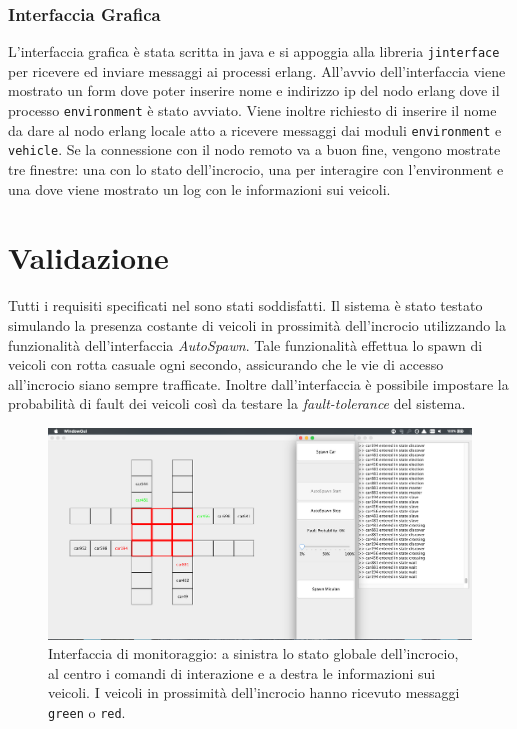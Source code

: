 \documentclass{memoir}
\begin{document}
\subsection{Interfaccia Grafica}
L'interfaccia grafica è stata scritta in java e si appoggia alla libreria
\texttt{jinterface} per ricevere ed inviare messaggi ai processi erlang.
All'avvio dell'interfaccia viene mostrato un form dove poter inserire nome e
indirizzo ip del nodo erlang dove il processo \texttt{environment} è stato
avviato. Viene inoltre richiesto di inserire il nome da dare al nodo erlang
locale atto a ricevere messaggi dai moduli \texttt{environment} e
\texttt{vehicle}. Se la connessione con il nodo remoto va a buon fine, vengono
mostrate tre finestre: una con lo stato dell'incrocio, una per interagire con
l'environment e una dove viene mostrato un log con le informazioni sui veicoli.

\chapter{Validazione}
Tutti i requisiti specificati nel  sono stati soddisfatti. Il
sistema è stato testato simulando la presenza costante di veicoli in prossimità
dell'incrocio utilizzando la funzionalità dell'interfaccia \emph{AutoSpawn}.
Tale funzionalità effettua lo spawn di veicoli con rotta casuale ogni secondo,
assicurando che le vie di accesso all'incrocio siano sempre trafficate. Inoltre
dall'interfaccia è possibile impostare la probabilità di fault dei veicoli così
da testare la \emph{fault-tolerance} del sistema.

\begin{figure}
\centering
\includegraphics[width=\textwidth]{greenred}
\caption{Interfaccia di monitoraggio: a sinistra lo stato globale dell'incrocio,
  al centro i comandi di interazione e a destra le informazioni sui veicoli. I
  veicoli in prossimità dell'incrocio hanno ricevuto messaggi \texttt{green} o
  \texttt{red}.}
\end{figure}
\end{document}
